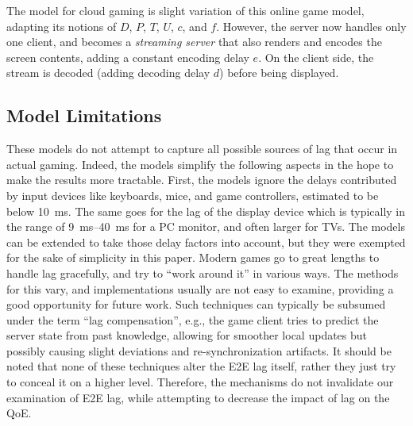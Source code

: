 The model for cloud gaming is slight variation of this online game model, adapting its notions of $D$, $P$, $T$, $U$, $c$, and $f$. However, the server now handles only one client, and becomes a \textit{streaming server} that also renders and encodes the screen contents, adding a constant encoding delay $e$. On the client side, the stream is decoded (adding decoding delay $d$) before being displayed.


\subsection{Model Limitations}

These models do not attempt to capture all possible sources of lag that occur in actual gaming. Indeed, the models simplify the following aspects in the hope to make the results more tractable. First, the models ignore the delays contributed by input devices like keyboards, mice, and game controllers, estimated to be below \SI{10}{\milli\second}. The same goes for the lag of the display device which is typically in the range of \SIrange{9}{40}{\milli\second} for a PC monitor, and often larger for TVs. The models can be extended to take those delay factors into account, but they were exempted for the sake of simplicity in this paper. Modern games go to great lengths to handle lag gracefully, and try to ``work around it'' in various ways. The methods for this vary, and implementations usually are not easy to examine, providing a good opportunity for future work. Such techniques can typically be subsumed under the term ``lag compensation'', e.g., the game client tries to predict the server state from past knowledge, allowing for smoother local updates but possibly causing slight deviations and re-synchronization artifacts. %
It should be noted that none of these techniques alter the \gls{E2E} lag itself, rather they just try to conceal it on a higher level. Therefore, the mechanisms do not invalidate our examination of \gls{E2E} lag, while attempting to decrease the impact of lag on the \gls{QoE}.



